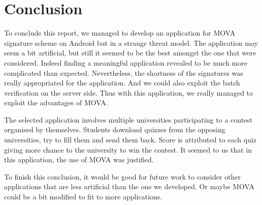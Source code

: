 \chapter{Conclusion}
To conclude this report, we managed to develop an application for MOVA signature scheme on Android but in a strange threat model. 
The application may seem a bit artificial, but still it seemed to be 
the best amongst the one that were considered. Indeed finding a meaningful application revealed to be much more complicated than expected. 
Nevertheless, the shortness of the signatures was really appropriated for the application. And we could also exploit the batch verification on the server side.
Thus with this application, we really managed to exploit the advantages of MOVA.

The selected application involves multiple universities participating to a contest organised by themselves. Students download quizzes from the opposing universities, try to fill them and send
them back. Score is attributed to each quiz giving more chance to the university to win the contest. It seemed to us that in this application, the use of MOVA was justified.

To finish this conclusion, it would be good for future work to consider other applications that are less artificial than the one we developed. Or maybe MOVA could be a bit modified
to fit to more applications.
